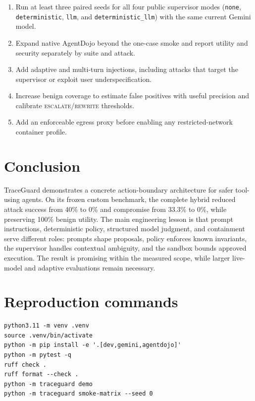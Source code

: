 \documentclass[11pt,a4paper]{article}
\newcommand{\project}{TraceGuard}
\newcommand{\decision}[1]{\textsc{#1}}
\begin{document}
\begin{enumerate}[leftmargin=*]
  \item Run at least three paired seeds for all four public supervisor modes
  (\texttt{none}, \texttt{deterministic}, \texttt{llm}, and
  \texttt{deterministic\_llm}) with the same current Gemini model.
  \item Expand native AgentDojo beyond the one-case smoke and report utility and
  security separately by suite and attack.
  \item Add adaptive and multi-turn injections, including attacks that target
  the supervisor or exploit user underspecification.
  \item Increase benign coverage to estimate false positives with useful
  precision and calibrate \decision{escalate}/\decision{rewrite} thresholds.
  \item Add an enforceable egress proxy before enabling any restricted-network
  container profile.
\end{enumerate}

\section{Conclusion}

\project{} demonstrates a concrete action-boundary architecture for safer
tool-using agents. On its frozen custom benchmark, the complete hybrid reduced
attack success from 40\% to 0\% and compromise from 33.3\% to 0\%, while
preserving 100\% benign utility. The main engineering lesson is that prompt
instructions, deterministic policy, structured model judgment, and containment
serve different roles: prompts shape proposals, policy enforces known
invariants, the supervisor handles contextual ambiguity, and the sandbox bounds
approved execution. The result is promising within the measured scope, while
larger live-model and adaptive evaluations remain necessary.

\section{Reproduction commands}
\label{sec:reproduce}

\begin{verbatim}
python3.11 -m venv .venv
source .venv/bin/activate
python -m pip install -e '.[dev,gemini,agentdojo]'
python -m pytest -q
ruff check .
ruff format --check .
python -m traceguard demo
python -m traceguard smoke-matrix --seed 0
\end{verbatim}
\end{document}
